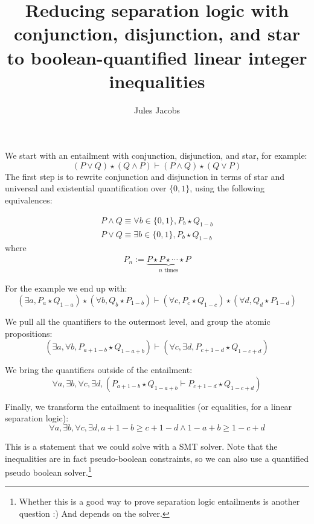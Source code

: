 \documentclass[a4paper, 11pt]{article}
\title{Reducing separation logic with conjunction, disjunction, and star to boolean-quantified linear integer inequalities}
\author{Jules Jacobs}
\begin{document}
\maketitle

We start with an entailment with conjunction, disjunction, and star, for example:
\[
  (P \vee Q) \star (Q \wedge P) \vdash (P \wedge Q) \star (Q \vee P)
\]
The first step is to rewrite conjunction and disjunction in terms of star and universal and existential quantification over $\{0,1\}$, using the following equivalences:

\begin{align*}
P \wedge Q \equiv \forall b \in \{0,1\}, P_b \star Q_{1 - b} \\
P \vee Q \equiv \exists b \in \{0,1\}, P_b \star Q_{1 - b}
\end{align*}
where
\begin{align*}
  P_n := \underbrace{P \star P \star \cdots \star P}_{n \text{ times}}
\end{align*}

For the example we end up with:
\[
  (\exists a, P_a \star Q_{1-a}) \star (\forall b, Q_b \star P_{1-b})
  \vdash
  (\forall c, P_c \star Q_{1-c}) \star (\forall d, Q_d \star P_{1-d})
\]

We pull all the quantifiers to the outermost level, and group the atomic propositions:
\[
  (\exists a, \forall b, P_{a + 1-b} \star Q_{1-a + b})
  \vdash
  (\forall c, \exists d,  P_{c + 1-d} \star Q_{1-c + d})
\]

We bring the quantifiers outside of the entailment:
\[
  \forall a, \exists b,  \forall c, \exists d,
    (P_{a + 1-b} \star Q_{1-a + b}
    \vdash
    P_{c + 1-d} \star Q_{1-c + d})
\]

Finally, we transform the entailment to inequalities (or equalities, for a linear separation logic):
\[
  \forall a, \exists b, \forall c, \exists d,
    a + 1-b \geq c + 1-d \wedge 1-a + b \geq 1-c + d
\]

This is a statement that we could solve with a SMT solver. Note that the inequalities are in fact pseudo-boolean constraints, so we can also use a quantified pseudo boolean solver.\footnote{Whether this is a good way to prove separation logic entailments is another question :) And depends on the solver.}
\end{document}
